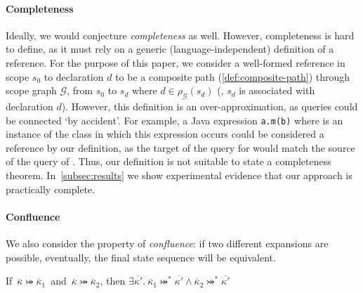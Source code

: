 \paragraph{Completeness}
Ideally, we would conjecture \emph{completeness} as well.
However, completeness is hard to define, as it must rely on a generic (language-independent) definition of a reference.
For the purpose of this paper, we consider a well-formed reference in scope $s_0$ to declaration $d$ to be a composite path (\cref{def:composite-path}) through scope graph $\mathcal{G}$, from $s_0$ to $s_d$ where $d \in \rho_{\mathcal{G}}(s_d)$ (\ie, $s_d$ is associated with declaration $d$).
However, this definition is an over-approximation, as queries could be connected `by accident'.
For example, a Java expression \texttt{a.m(b)} where  is an instance of the class in which this expression occurs could be considered a reference  by our definition, as the target of the query for  would match the source of the query of .
Thus, our definition is not suitable to state a completeness theorem.
In~\cref{subsec:results} we show experimental evidence that our approach is practically complete.



\paragraph{Confluence}
We also consider the property of \emph{confluence}: if two different expansions are possible, eventually, the final state sequence will be equivalent.

\begin{theorem}[Confluence]
  If\ $\overline{\kappa} \twoheadrightarrowtail \overline{\kappa}_1$~and~$\overline{\kappa} \twoheadrightarrowtail \overline{\kappa}_2$, %
  then $\exists \overline{\kappa'}.\: \overline{\kappa}_1 \twoheadrightarrowtail^\ast \overline{\kappa'} \land \overline{\kappa}_2 \twoheadrightarrowtail^\ast \overline{\kappa'} $
\end{theorem}

